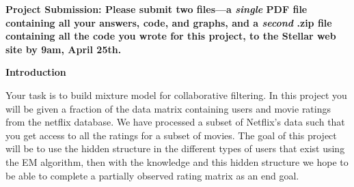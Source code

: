 

\usepackage[pdftex]{graphicx}
\usepackage{amsmath, amsthm, amssymb, amsfonts, mathtools, graphicx, enumerate}
\usepackage{times}
\usepackage{booktabs}
\usepackage{url}
\usepackage{enumerate}
\usepackage{enumitem}

\setlength{\parindent}{0pt}
\setlength{\parskip}{1ex}

\newcommand{\answer}[1]{{\mbox{}\color{red}{#1}}}
\newcommand{\emptycheck}{\text{(\hspace{-.75ex}(\hspace{3ex})\hspace{-.75ex})}}
\newcommand{\checkans}[1]{\text{(\hspace{-.75ex}(\hspace{1ex}{#1}\hspace{1ex})\hspace{-.75ex})}}
\newcommand{\argmax}{{\mbox{arg}\hspace{-.1ex}}\max}





{\bf Project Submission: Please submit two files---a \emph{single} PDF file containing all your answers, code, and graphs, and a
\emph{second} .zip file containing all the code you wrote for this
project, to
the Stellar web site by 9am, April 25th.}

\textbf{Introduction}

Your task is to build mixture model for collaborative filtering. In this project you will be given a fraction of the data matrix containing users and movie ratings from the netflix database. We have processed a subset of Netflix's data such that you get access to all the ratings for a subset of movies. The goal of this project will be to use the hidden structure in the different types of users that exist using the EM algorithm, then with the knowledge and this hidden structure we hope to be able to complete a partially observed rating matrix as an end goal.

